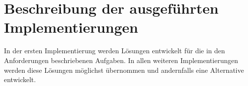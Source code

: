 

\newpage
\section{Beschreibung der ausgeführten Implementierungen}
In der ersten Implementierung werden Lösungen entwickelt für die in den Anforderungen beschriebenen Aufgaben. In allen weiteren Implementierungen werden diese Lösungen möglichst übernommen und andernfalls eine Alternative entwickelt.
